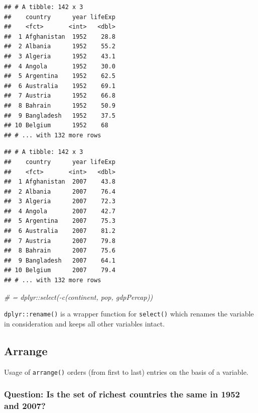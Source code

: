 \documentclass[]{article}
\newenvironment{Shaded}{\begin{snugshade}}{\end{snugshade}}
\newcommand{\KeywordTok}[1]{\textcolor[rgb]{0.13,0.29,0.53}{\textbf{#1}}}
\newcommand{\DecValTok}[1]{\textcolor[rgb]{0.00,0.00,0.81}{#1}}
\newcommand{\StringTok}[1]{\textcolor[rgb]{0.31,0.60,0.02}{#1}}
\newcommand{\CommentTok}[1]{\textcolor[rgb]{0.56,0.35,0.01}{\textit{#1}}}
\newcommand{\OperatorTok}[1]{\textcolor[rgb]{0.81,0.36,0.00}{\textbf{#1}}}
\newcommand{\NormalTok}[1]{#1}
\begin{document}
\begin{verbatim}
## # A tibble: 142 x 3
##    country      year lifeExp
##    <fct>       <int>   <dbl>
##  1 Afghanistan  1952    28.8
##  2 Albania      1952    55.2
##  3 Algeria      1952    43.1
##  4 Angola       1952    30.0
##  5 Argentina    1952    62.5
##  6 Australia    1952    69.1
##  7 Austria      1952    66.8
##  8 Bahrain      1952    50.9
##  9 Bangladesh   1952    37.5
## 10 Belgium      1952    68  
## # ... with 132 more rows
\end{verbatim}

\begin{Shaded}
\end{Shaded}

\begin{verbatim}
## # A tibble: 142 x 3
##    country      year lifeExp
##    <fct>       <int>   <dbl>
##  1 Afghanistan  2007    43.8
##  2 Albania      2007    76.4
##  3 Algeria      2007    72.3
##  4 Angola       2007    42.7
##  5 Argentina    2007    75.3
##  6 Australia    2007    81.2
##  7 Austria      2007    79.8
##  8 Bahrain      2007    75.6
##  9 Bangladesh   2007    64.1
## 10 Belgium      2007    79.4
## # ... with 132 more rows
\end{verbatim}

\begin{Shaded}
\begin{Highlighting}[]
\CommentTok{# = dplyr::select(-c(continent, pop, gdpPercap))}
\end{Highlighting}
\end{Shaded}

\texttt{dplyr::rename()} is a wrapper function for \texttt{select()}
which renames the variable in consideration and keeps all other
variables intact.

\subsection{Arrange}\label{arrange}

Usage of \texttt{arrange()} orders (from first to last) entries on the
basis of a variable.

\subsubsection{Question: Is the set of richest countries the same in
1952 and
2007?}\label{question-is-the-set-of-richest-countries-the-same-in-1952-and-2007}
\end{document}
